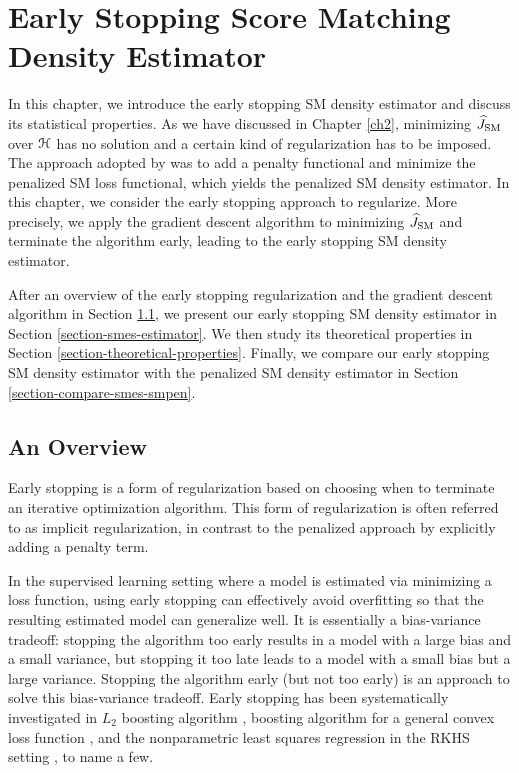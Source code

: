 \chapter{Early Stopping Score Matching Density Estimator}
\label{ch3}


In this chapter, we introduce the early stopping SM density estimator and discuss its statistical properties. As we have discussed in Chapter \ref{ch2}, minimizing $\widehat{J}_{\mathrm{SM}}$ over $\mathcal{H}$ has no solution and a certain kind of regularization has to be imposed. The approach adopted by \textcite{Sriperumbudur-density-estimation-inf-exp-family} was to add a penalty functional and minimize the penalized SM loss functional, which yields the penalized SM density estimator. In this chapter, we consider the early stopping approach to regularize. More precisely, we apply the gradient descent algorithm to minimizing $\widehat{J}_{\mathrm{SM}}$ and terminate the algorithm early, leading to the early stopping SM density estimator. 

After an overview of the early stopping regularization and the gradient descent algorithm in Section \ref{section-gd-overview}, we present our early stopping SM density estimator in Section \ref{section-smes-estimator}. We then study its theoretical properties in Section \ref{section-theoretical-properties}. Finally, we compare our early stopping SM density estimator with the penalized SM density estimator in Section \ref{section-compare-smes-smpen}. 

\section{An Overview} \label{section-gd-overview}

Early stopping is a form of regularization based on choosing when to terminate an iterative optimization algorithm. This form of regularization is often referred to as implicit regularization, in contrast to the penalized approach by explicitly adding a penalty term. %

In the supervised learning setting where a model is estimated via minimizing a loss function, using early stopping can effectively avoid overfitting so that the resulting estimated model can generalize well. It is essentially a bias-variance tradeoff: stopping the algorithm too early results in a model with a large bias and a small variance, but stopping it too late leads to a model with a small bias but a large variance. Stopping the algorithm early (but not too early) is an approach to solve this bias-variance tradeoff. Early stopping has been systematically investigated in $L_2$ boosting algorithm \parencite{Buhlmann2003-dk}, boosting algorithm for a general convex loss function \parencite{Zhang2005-pi}, and the nonparametric least squares regression in the RKHS setting \parencite{Yao2007-ji,Raskutti14-dw}, to name a few. 

